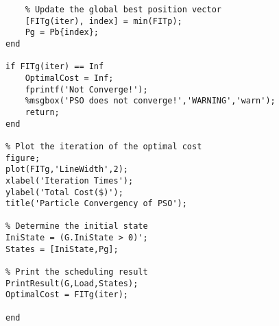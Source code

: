 \begin{verbatim}
    % Update the global best position vector
    [FITg(iter), index] = min(FITp);
    Pg = Pb{index};
end

if FITg(iter) == Inf
    OptimalCost = Inf;
    fprintf('Not Converge!');
    %msgbox('PSO does not converge!','WARNING','warn');
    return;
end

% Plot the iteration of the optimal cost
figure;
plot(FITg,'LineWidth',2);
xlabel('Iteration Times');
ylabel('Total Cost($)');
title('Particle Convergency of PSO');

% Determine the initial state
IniState = (G.IniState > 0)';
States = [IniState,Pg];

% Print the scheduling result
PrintResult(G,Load,States);
OptimalCost = FITg(iter);

end
\end{verbatim}

